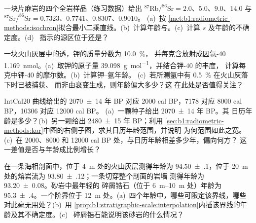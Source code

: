\begin{exercise}[$\star\star$]\label{exo:b1:radiometric-methods:5}
一块片麻岩的四个全岩样品（练习数据）给出
$^{87}\mathrm{Rb}/^{86}\mathrm{Sr} = 2.0$、$5.0$、$9.0$、$14.0$ 与
$^{87}\mathrm{Sr}/^{86}\mathrm{Sr} = 0.7323$、$0.7741$、$0.8307$、$0.9010$。
(a)~按
\cref{met:b1:radiometric-methods:isochron}拟合最小二乘直线。(b)~计算年龄与。(c)~计算 $s$ 及年龄的不确定度。(d)~
指示的源区位于还是？
\end{exercise}

\begin{exercise}[$\star\star$]\label{exo:b1:radiometric-methods:6}
一块火山灰层中的透，钾的质量分数为 \qty{10.0}{\percent}，
并每克含放射成因氩-40 \qty{1.169}{nmol}。(a)~取钾的原子量
\qty{39.098}{g.mol^{-1}}，并结合钾-40 的丰度，
计算每克中钾-40 的摩尔数。(b)~计算钾–氩年龄。
(c)~若所测氩中有 \qty{0.5}{\percent} 在火山灰落下时已被捕获、
而非由衰变生成，则年龄偏大多少？这
在此处是否值得关注？
\end{exercise}

\begin{exercise}[$\star\star$]\label{exo:b1:radiometric-methods:7}
IntCal20 曲线给出的 \num[uncertainty-mode=separate]{2070 \pm 14} 年 BP 对应 \num{2000}
cal BP，\num{7178} 对应 \num{8000} cal BP，\num{10306} 对应 \num{12000} cal BP。
(a)~一颗种子给出 \num[uncertainty-mode=separate]{2070 \pm 14} 年 BP。其
日历年龄是多少？(b)~另一颗给出 \num[uncertainty-mode=separate]{2480 \pm 15} 年
BP；利用
\cref{sec:b1:radiometric-methods:kar}中图的右侧子图，求其日历年龄范围，并说明
为何范围如此之宽。(c)~在
\num{2000}、\num{8000} 和 \num{12000} cal BP 处，与日历年龄相差多少年，偏向何方？
这一差值是否与年龄成比例增长？
\end{exercise}

\begin{exercise}[$\star\star$]\label{exo:b1:radiometric-methods:8}
在一条海相剖面中，位于 \qty{4}{m} 处的火山灰层测得年龄为
\qty[uncertainty-mode=separate]{94.50(10)}{\Ma}，位于 \qty{20}{m} 处的熔岩流为
\qty[uncertainty-mode=separate]{93.80(12)}{\Ma}；一条切穿整个剖面的岩墙
测得年龄为 \qty[uncertainty-mode=separate]{93.20(8)}{\Ma}。砂岩中最年轻的
碎屑锆石（位于 \qtyrange{6}{10}{m} 处）年龄为
\qty[uncertainty-mode=separate]{95.3(4)}{\Ma}。一个阶界位于
\qty{12}{m} 处。(a)~四个年龄中，哪些可限定该界线，哪些
对此毫无用处？(b)~用
\cref{prop:b1:stratigraphic-scale:interpolation}内插该界线的年龄及其不确定度。(c)~
碎屑锆石能说明该砂岩的什么情况？
\end{exercise}

